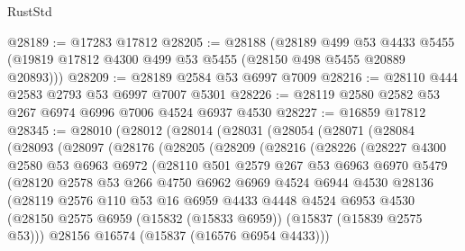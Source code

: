 \begin{lexlean}{RustStd}
\begin{coremodule}
{\begin{coremodule}
{{{{{{{{{{{{{{{{{{{{{{{{{{{{{{{{{{{{{{{{{{{{{{{{{{{{{{{{{{{{@28189 := @17283 @17812
@28205 := @28188
    (@28189
      @499
      @53
      @4433
      @5455
      (@19819 @17812 @4300 @499 @53 @5455 (@28150 @498 @5455 @20889 @20893)))
@28209 := @28189 @2584 @53 @6997 @7009
@28216 := @28110 @444 @2583 @2793 @53 @6997 @7007 @5301
@28226 := @28119 @2580 @2582 @53 @267 @6974 @6996 @7006 @4524 @6937 @4530
@28227 := @16859 @17812
@28345 := @28010
    (@28012
      (@28014
        (@28031
          (@28054
            (@28071
              (@28084
                (@28093
                  (@28097
                    (@28176
                      (@28205
                        (@28209
                          (@28216
                            (@28226
                              (@28227
                                @4300
                                @2580
                                @53
                                @6963
                                @6972
                                (@28110
                                  @501
                                  @2579
                                  @267
                                  @53
                                  @6963
                                  @6970
                                  @5479
                                  (@28120
                                    @2578
                                    @53
                                    @266
                                    @4750
                                    @6962
                                    @6969
                                    @4524
                                    @6944
                                    @4530
                                    @28136
                                    (@28119
                                      @2576
                                      @110
                                      @53
                                      @16
                                      @6959
                                      @4433
                                      @4448
                                      @4524
                                      @6953
                                      @4530
                                      (@28150
                                        @2575
                                        @6959
                                        (@15832 (@15833 @6959))
                                        (@15837 (@15839 @2575 @53)))
                                      @28156
                                      @16574
                                      (@15837 (@16576 @6954 @4433)))
}}}}}}}}}}}}}}}}}}}}}}}}}}}}}}}}}}}}}}}}}}}}}}}}}}}}}}}}}}}}
\end{coremodule}}
\end{coremodule}
\end{lexlean}
